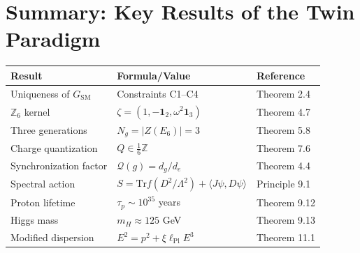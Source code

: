\documentclass[11pt,a4paper,openright]{book}
\theoremstyle{plain}
\theoremstyle{definition}
\newcommand{\SM}{\mathrm{SM}}
\newcommand{\Pl}{\mathrm{Pl}}
\newcommand{\Tr}{\mathrm{Tr}}
\newcommand{\Z}{\mathbb{Z}}
\begin{document}
\section{Summary: Key Results of the Twin Paradigm}

\begin{center}
\begin{tabular}{lll}
\toprule
\textbf{Result} & \textbf{Formula/Value} & \textbf{Reference} \\
\midrule
Uniqueness of $G_{\SM}$ & Constraints C1--C4 & Theorem 2.4 \\
$\Z_6$ kernel & $\zeta = (1, -\mathbf{1}_2, \omega^2\mathbf{1}_3)$ & Theorem 4.7 \\
Three generations & $N_g = |Z(E_6)| = 3$ & Theorem 5.8 \\
Charge quantization & $Q \in \frac{1}{6}\Z$ & Theorem 7.6 \\
Synchronization factor & $\mathcal{Q}(g) = d_g/d_e$ & Theorem 4.4 \\
Spectral action & $S = \Tr f(D^2/\Lambda^2) + \langle J\psi, D\psi\rangle$ & Principle 9.1 \\
Proton lifetime & $\tau_p \sim 10^{35}$ years & Theorem 9.12 \\
Higgs mass & $m_H \approx 125$ GeV & Theorem 9.13 \\
Modified dispersion & $E^2 = p^2 + \xi\ell_{\Pl}E^3$ & Theorem 11.1 \\
\bottomrule
\end{tabular}
\end{center}

\end{document}
